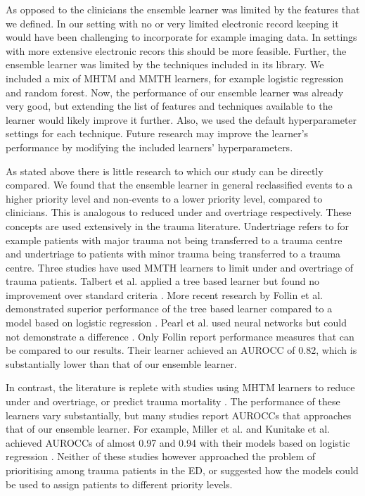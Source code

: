 \documentclass[10pt,letterpaper]{article}\usepackage[]{graphicx}\usepackage[]{color}
\begin{document}
As opposed to the clinicians the ensemble learner was limited by the features
that we defined. In our setting with no or very limited electronic record
keeping it would have been challenging to incorporate for example imaging
data. In settings with more extensive electronic recors this should be more
feasible. Further, the ensemble learner was limited by the techniques included
in its library. We included a mix of MHTM and MMTH learners, for example
logistic regression and random forest. Now, the performance of our ensemble
learner was already very good, but extending the list of features and techniques
available to the learner would likely improve it further.  Also, we used the
default hyperparameter settings for each technique. Future research may improve
the learner's performance by modifying the included learners' hyperparameters.

As stated above there is little research to which our study can be directly
compared. We found that the ensemble learner in general reclassified events to a
higher priority level and non-events to a lower priority level, compared to
clinicians. This is analogous to reduced under and overtriage
respectively. These concepts are used extensively in the trauma
literature. Undertriage refers to for example patients with major trauma not
being transferred to a trauma centre and undertriage to patients with minor
trauma being transferred to a trauma centre. Three studies have used MMTH
learners to limit under and overtriage of trauma patients.  Talbert et
al. applied a tree based learner but found no improvement over standard criteria
\cite{Talbert2007}. More recent research by Follin et al. demonstrated superior
performance of the tree based learner compared to a model based on logistic
regression \cite{Follin2016}. Pearl et al. used neural networks but could not
demonstrate a difference \cite{Pearl2008}. Only Follin report performance
measures that can be compared to our results. Their learner achieved an AUROCC
of 0.82, which is substantially lower than that of our ensemble learner.

In contrast, the literature is replete with studies using MHTM learners to
reduce under and overtriage, or predict trauma mortality \cite{Rehn2011,
  DeMunter2017,VanRein2018}. The performance of these learners vary
substantially, but many studies report AUROCCs that approaches that of our
ensemble learner. For example, Miller et al. and Kunitake et al. achieved
AUROCCs of almost 0.97 and 0.94 with their models based on logistic regression
\cite{Miller2017}. Neither of these studies however approached the problem of
prioritising among trauma patients in the ED, or suggested how the models could
be used to assign patients to different priority levels.
\end{document}
